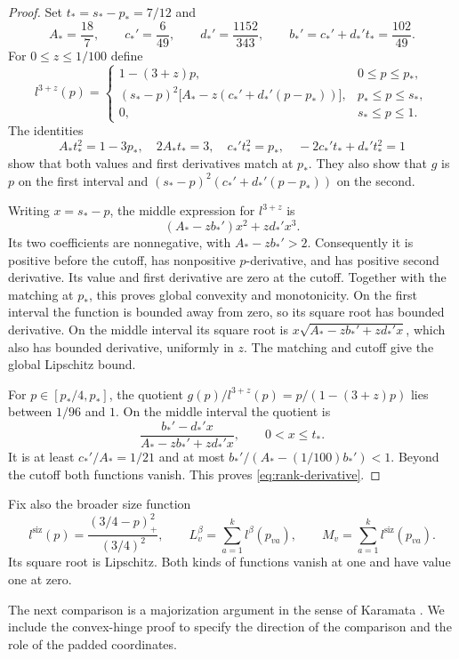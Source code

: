 \begin{proof}
Set $t_*=s_*-p_*=7/12$ and
\[
 A_*=\frac{18}{7},\qquad c_*'=\frac6{49},\qquad
 d_*'=\frac{1152}{343},\qquad b_*'=c_*'+d_*'t_*=\frac{102}{49}.
\]
For $0\le z\le1/100$ define
\begin{equation}\label{eq:explicit-rank}
 l^{3+z}(p)=
 \begin{cases}
  1-(3+z)p,&0\le p\le p_*,\\
  (s_*-p)^2\bigl[A_*-z(c_*'+d_*'(p-p_*))\bigr],
                                     &p_*\le p\le s_*,\\
  0,&s_*\le p\le1.
 \end{cases}
\end{equation}
The identities
\[
 A_*t_*^2=1-3p_*,\quad 2A_*t_*=3,\quad
 c_*'t_*^2=p_*,\quad -2c_*'t_*+d_*'t_*^2=1
\]
show that both values and first derivatives match at $p_*$.
They also show that $g$ is $p$ on the first interval and
$(s_*-p)^2(c_*'+d_*'(p-p_*))$ on the second.

Writing $x=s_*-p$, the middle expression for $l^{3+z}$ is
\[
            (A_*-zb_*')x^2+zd_*'x^3.
\]
Its two coefficients are nonnegative, with $A_*-zb_*'>2$.
Consequently it is positive before the cutoff, has nonpositive
$p$-derivative, and has positive second derivative.  Its value and
first derivative are zero at the cutoff.  Together with the matching
at $p_*$, this proves global convexity and monotonicity.
On the first interval the function is bounded away from zero, so its
square root has bounded derivative.  On the middle interval its square
root is
$x\sqrt{A_*-zb_*'+zd_*'x}$, which also has bounded derivative,
uniformly in $z$.  The matching and cutoff give the global Lipschitz bound.

For $p\in[p_*/4,p_*]$, the quotient
$g(p)/l^{3+z}(p)=p/(1-(3+z)p)$ lies between $1/96$ and $1$.
On the middle interval the quotient is
\[
 \frac{b_*'-d_*'x}{A_*-zb_*'+zd_*'x},\qquad 0<x\le t_*.
\]
It is at least $c_*'/A_*=1/21$ and at most
$b_*'/(A_*-(1/100)b_*')<1$.  Beyond the cutoff both functions vanish.
This proves \eqref{eq:rank-derivative}.
\end{proof}

Fix also the broader size function
\[
 l^{\mathrm{siz}}(p)=\frac{(3/4-p)_+^2}{(3/4)^2},\qquad
 L_v^\beta=\sum_{a=1}^k l^\beta(p_{va}),\qquad
 M_v=\sum_{a=1}^k l^{\mathrm{siz}}(p_{va}).
\]
Its square root is Lipschitz.  Both kinds of functions vanish at one
and have value one at zero.

The next comparison is a majorization argument in the sense of
Karamata \cite{Karamata32}. We include the convex-hinge proof to specify
the direction of the comparison and the role of the padded coordinates.

